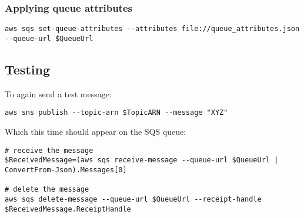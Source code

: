 \subsubsection{Applying queue attributes}\label{applying-queue-attributes}

\begin{verbatim}
aws sqs set-queue-attributes --attributes file://queue_attributes.json --queue-url $QueueUrl
\end{verbatim}

\subsection{Testing}\label{testing}

To again send a test message:

\begin{verbatim}
aws sns publish --topic-arn $TopicARN --message "XYZ"
\end{verbatim}

Which this time should appear on the SQS queue:

\begin{verbatim}
# receive the message
$ReceivedMessage=(aws sqs receive-message --queue-url $QueueUrl | ConvertFrom-Json).Messages[0]

# delete the message
aws sqs delete-message --queue-url $QueueUrl --receipt-handle $ReceivedMessage.ReceiptHandle
\end{verbatim}


